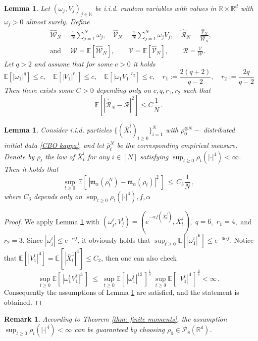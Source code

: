 \documentclass[12pt]{amsart}
\newcommand{\RR}{{\mathbb R}}
\newcommand{\EE}{{\mathbb E}}
\newcommand{\mm}{{\mathfrak{m}}}
\newcommand{\NN}{{\mathbb N}}
\newcommand{\OX}{{\overline{X}}}
\newcommand{\mc}[1]{\mathcal{#1}}
\numberwithin{equation}{section}
\newtheorem{lemma}[theorem]{Lemma}
\newtheorem{remark}[theorem]{Remark}
\begin{document}
\begin{lemma}{\cite[Theorem 1, \& \S3.1]{doukhan2009evaluation}}\label{lemconver}
Let $(\omega_j,V_j)_{j\in\NN}$ be i.i.d. random variables with values in $\RR\times\RR^d$ with $\omega_j>0$ almost surely. Define 
\begin{align*}
    & \hat{\mc{W}}_N=\frac{1}{N}\sum_{j=1}^{N}\omega_j, \quad \hat{\mc{V}}_N=\frac{1}{N}\sum_{j=1}^{N}\omega_jV_j,\quad \hat{\mc R}_N=\frac{\hat{\mc{V}}_N}{\hat{\mc{W}}_N},\,\\
    & \text{and } \quad \mc W=\EE[\hat{\mc{W}}_N], \quad \quad  \mc{V}=\EE[\hat{\mc{V}}_N], \quad \quad  \mc{R}=\frac{\mc V}{\mc W}.
\end{align*}
Let $q>2$ and assume that for some $c>0$ it holds
\begin{equation*}
    \EE[|\omega_1|^q]\leq c,\quad \EE[|V_1|^{r_1}]\leq c,\quad \EE[|\omega_1V_1|^{r_2}]\leq c,\quad r_1:=\frac{2(q+2)}{q-2},\quad r_2:=\frac{2q}{q-2}
\end{equation*}
Then there exists some $C>0$ depending only on $c,q,r_1,r_2$ such that
\begin{equation*}
    \EE[|\hat{\mc R}_N-\mc R|^2]\leq C\frac{1}{N}\,.
\end{equation*}
\end{lemma}



\begin{lemma}\label{lembarrhoN}
	Consider i.i.d.  particles  $\{(\OX_t^i)_{t\geq 0}\}_{i=1}^N$  with $\rho_0^{\otimes N}-$ distributed initial data \eqref{CBO kappa}, and let $\bar \rho_t^N$ be the corresponding empirical measure. Denote by $\rho_t$ the law of $\OX_t^i$ for any $i\in[N]$ satisfying $\sup_{t\geq 0}\rho_t(|\cdot|^4)<\infty$. Then it holds that
	\begin{equation*}
		\sup_{t\geq 0}\,\EE[\,|\mm_\alpha(\bar\rho_t^N)-\mm_\alpha(\rho_t)|^2\,]\,\leq\, C_3\frac{1}{N}\,,
	\end{equation*}
	where $C_3$ depends only on $\sup_{t\geq 0}\rho_t(|\cdot|^4),\underline f,\alpha$
\end{lemma}

\begin{proof}
	We apply Lemma \ref{lemconver} with $(\omega_j^t,V_j^t)=(e^{-\alpha f(\OX_t^j)},\OX_t^j)$,\, $q=6$,\, $r_1=4$,\, and $r_2=3$.  Since $|\omega_j^t|\leq e^{-\alpha\underline f}$, it obviously holds that $\sup_{t\geq 0}\EE[|\omega_1^t|^6]\leq e^{-6\alpha\underline f}$. Notice that $\EE[|V_1^t|^4]=\EE[|\OX_t^1|^4]\leq C_2 $, then one can also check
	\begin{equation*}
		\sup_{t\geq 0}\EE[\,|\omega_1^tV_1^t|^3\,] \; \leq \; \sup_{t\geq 0}\EE[\,|\omega_1^t|^{12}\,]^{\frac{1}{4}}\;\sup_{t\geq 0}\EE[\,|V_1^t|^4\,]^{\frac{3}{4}}<\infty\,.
	\end{equation*}
	Consequently the assumptions  of Lemma \ref{lemconver} are satisfied, and the statement is obtained.
\end{proof} 
\begin{remark}
    According to Theorem \ref{thm: finite moments}, the assumption $\sup_{t\geq 0}\rho_t(|\cdot|^4)<\infty$ can be guaranteed by choosing $\rho_0\in \mathscr{P}_8(\RR^d)$.
\end{remark}
\end{document}
